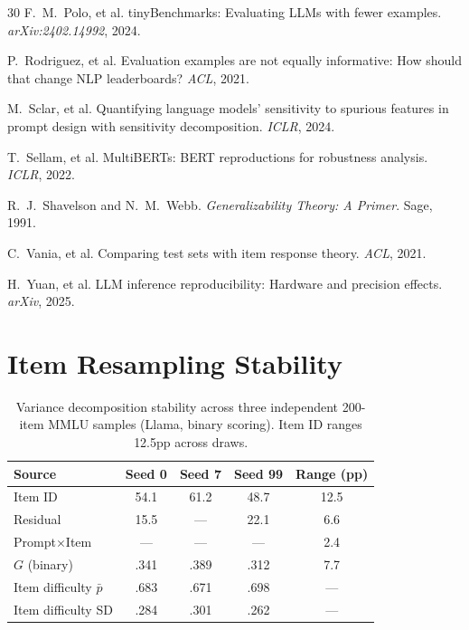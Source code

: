 \documentclass[11pt,twocolumn]{article}
\newcommand{\Gcoeff}{\ensuremath{G}}
\begin{document}
{\begin{thebibliography}{30}
F.~M.~Polo, et al.
\newblock tinyBenchmarks: Evaluating LLMs with fewer examples.
\newblock \emph{arXiv:2402.14992}, 2024.

P.~Rodriguez, et al.
\newblock Evaluation examples are not equally informative: How should that change NLP leaderboards?
\newblock \emph{ACL}, 2021.

M.~Sclar, et al.
\newblock Quantifying language models' sensitivity to spurious features in prompt design with sensitivity decomposition.
\newblock \emph{ICLR}, 2024.

T.~Sellam, et al.
\newblock MultiBERTs: BERT reproductions for robustness analysis.
\newblock \emph{ICLR}, 2022.

R.~J.~Shavelson and N.~M.~Webb.
\newblock \emph{Generalizability Theory: A Primer}.
\newblock Sage, 1991.

C.~Vania, et al.
\newblock Comparing test sets with item response theory.
\newblock \emph{ACL}, 2021.

H.~Yuan, et al.
\newblock LLM inference reproducibility: Hardware and precision effects.
\newblock \emph{arXiv}, 2025.

\end{thebibliography}
}

\appendix
\onecolumn

\section{Item Resampling Stability}
\label{app:resampling}

\begin{table}[h]
\centering
\caption{Variance decomposition stability across three independent 200-item MMLU samples (Llama, binary scoring). Item ID ranges 12.5pp across draws.}
\label{tab:resampling}
\begin{tabular}{@{}lcccc@{}}
\toprule
\textbf{Source} & \textbf{Seed 0} & \textbf{Seed 7} & \textbf{Seed 99} & \textbf{Range (pp)} \\
\midrule
Item ID      & 54.1 & 61.2 & 48.7 & 12.5 \\
Residual     & 15.5 &  --- & 22.1 &  6.6 \\
Prompt$\times$Item &  ---  &  ---  &  ---  & 2.4 \\
\midrule
$\Gcoeff$ (binary) & .341 & .389 & .312 & 7.7 \\
\midrule
Item difficulty $\bar{p}$ & .683 & .671 & .698 & --- \\
Item difficulty SD & .284 & .301 & .262 & --- \\
\bottomrule
\end{tabular}
\end{table}
\end{document}
